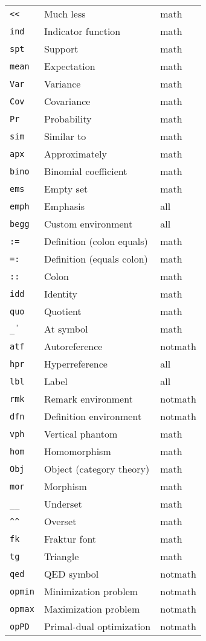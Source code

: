 \documentclass{article}
\begin{document}
\begin{longtable}{|p{}|p{}|p{}|}
\texttt{<<} & Much less & math \\
\texttt{ind} & Indicator function & math \\
\texttt{spt} & Support & math \\
\texttt{mean} & Expectation & math \\
\texttt{Var} & Variance & math \\
\texttt{Cov} & Covariance & math \\
\texttt{Pr} & Probability & math \\
\texttt{sim} & Similar to & math \\
\texttt{apx} & Approximately & math \\
\texttt{bino} & Binomial coefficient & math \\
\texttt{ems} & Empty set & math \\
\texttt{emph} & Emphasis & all \\
\texttt{begg} & Custom environment & all \\
\texttt{:=} & Definition (colon equals) & math \\
\texttt{=:} & Definition (equals colon) & math \\
\texttt{::} & Colon & math \\
\texttt{idd} & Identity & math \\
\texttt{quo} & Quotient & math \\
\texttt{\|\_} & At symbol & math \\
\texttt{atf} & Autoreference & notmath \\
\texttt{hpr} & Hyperreference & all \\
\texttt{lbl} & Label & all \\
\texttt{rmk} & Remark environment & notmath \\
\texttt{dfn} & Definition environment & notmath \\
\texttt{vph} & Vertical phantom & math \\
\texttt{hom} & Homomorphism & math \\
\texttt{Obj} & Object (category theory) & math \\
\texttt{mor} & Morphism & math \\
\texttt{\_\_} & Underset & math \\
\texttt{\^{}\^{}} & Overset & math \\
\texttt{fk} & Fraktur font & math \\
\texttt{tg} & Triangle & math \\
\texttt{qed} & QED symbol & notmath \\
\texttt{opmin} & Minimization problem & notmath \\
\texttt{opmax} & Maximization problem & notmath \\
\texttt{opPD} & Primal-dual optimization & notmath \\
\hline
\end{longtable}
\end{document}
